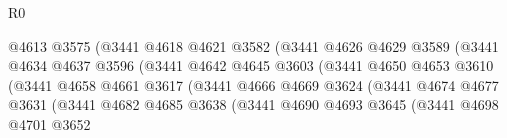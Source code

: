 \begin{lexlean}{R0}
\begin{coremodule}
                                        @4613
                                        @3575
                                        (@3441
                                          @4618
                                          @4621
                                          @3582
                                          (@3441
                                            @4626
                                            @4629
                                            @3589
                                            (@3441
                                              @4634
                                              @4637
                                              @3596
                                              (@3441
                                                @4642
                                                @4645
                                                @3603
                                                (@3441
                                                  @4650
                                                  @4653
                                                  @3610
                                                  (@3441
                                                    @4658
                                                    @4661
                                                    @3617
                                                    (@3441
                                                      @4666
                                                      @4669
                                                      @3624
                                                      (@3441
                                                        @4674
                                                        @4677
                                                        @3631
                                                        (@3441
                                                          @4682
                                                          @4685
                                                          @3638
                                                          (@3441
                                                            @4690
                                                            @4693
                                                            @3645
                                                            (@3441
                                                              @4698
                                                              @4701
                                                              @3652

\end{coremodule}
\end{lexlean}
